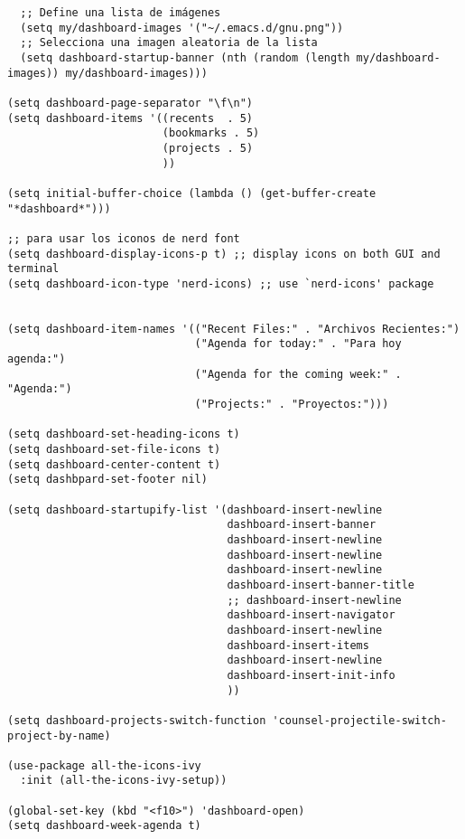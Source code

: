 \documentclass[11pt]{article}
\begin{document}
\begin{verbatim}
  ;; Define una lista de imágenes
  (setq my/dashboard-images '("~/.emacs.d/gnu.png"))
  ;; Selecciona una imagen aleatoria de la lista
  (setq dashboard-startup-banner (nth (random (length my/dashboard-images)) my/dashboard-images))) 

(setq dashboard-page-separator "\f\n")
(setq dashboard-items '((recents  . 5)
                        (bookmarks . 5)
                        (projects . 5)
                        ))

(setq initial-buffer-choice (lambda () (get-buffer-create "*dashboard*")))

;; para usar los iconos de nerd font
(setq dashboard-display-icons-p t) ;; display icons on both GUI and terminal
(setq dashboard-icon-type 'nerd-icons) ;; use `nerd-icons' package


(setq dashboard-item-names '(("Recent Files:" . "Archivos Recientes:")
                             ("Agenda for today:" . "Para hoy agenda:")
                             ("Agenda for the coming week:" . "Agenda:")
                             ("Projects:" . "Proyectos:")))

(setq dashboard-set-heading-icons t)
(setq dashboard-set-file-icons t)
(setq dashboard-center-content t)
(setq dashbpard-set-footer nil)

(setq dashboard-startupify-list '(dashboard-insert-newline
                                  dashboard-insert-banner
                                  dashboard-insert-newline
                                  dashboard-insert-newline
                                  dashboard-insert-newline
                                  dashboard-insert-banner-title
                                  ;; dashboard-insert-newline
                                  dashboard-insert-navigator
                                  dashboard-insert-newline
                                  dashboard-insert-items
                                  dashboard-insert-newline
                                  dashboard-insert-init-info
                                  ))

(setq dashboard-projects-switch-function 'counsel-projectile-switch-project-by-name)

(use-package all-the-icons-ivy
  :init (all-the-icons-ivy-setup))

(global-set-key (kbd "<f10>") 'dashboard-open)
(setq dashboard-week-agenda t)
\end{verbatim}
\end{document}
